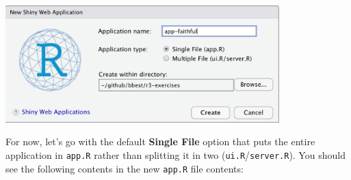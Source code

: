 \documentclass[
  letterpaper,
  DIV=11,
  numbers=noendperiod]{scrreprt}
\begin{document}
\includegraphics[width=4.16667in,height=\textheight]{./figs/shiny/new-shiny_app-faithful.png}

For now, let's go with the default \textbf{Single File} option that puts
the entire application in \texttt{app.R} rather than splitting it in two
(\texttt{ui.R}/\texttt{server.R}). You should see the following contents
in the new \texttt{app.R} file contents:
\end{document}
